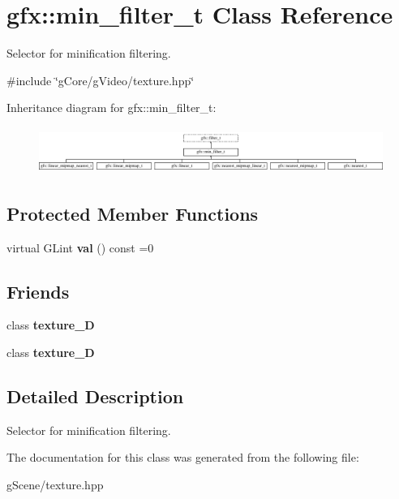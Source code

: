 \hypertarget{classgfx_1_1min__filter__t}{\section{gfx\-:\-:min\-\_\-filter\-\_\-t Class Reference}
\label{classgfx_1_1min__filter__t}
}


Selector for minification filtering.  




{\ttfamily \#include \char`\"{}g\-Core/g\-Video/texture.\-hpp\char`\"{}}

Inheritance diagram for gfx\-:\-:min\-\_\-filter\-\_\-t\-:\begin{figure}[H]
\begin{center}
\leavevmode
\includegraphics[height=1.530055cm]{classgfx_1_1min__filter__t}
\end{center}
\end{figure}
\subsection*{Protected Member Functions}
\begin{DoxyCompactItemize}
\item 
\hypertarget{classgfx_1_1min__filter__t_a75592c379c8d1a09f9d974967afc6584}{virtual G\-Lint {\bfseries val} () const =0}\label{classgfx_1_1min__filter__t_a75592c379c8d1a09f9d974967afc6584}

\end{DoxyCompactItemize}
\subsection*{Friends}
\begin{DoxyCompactItemize}
\item 
\hypertarget{classgfx_1_1min__filter__t_a2039d67f6166ccf823c78e3476aad9aa}{class {\bfseries texture\-\_\-D}}\label{classgfx_1_1min__filter__t_a2039d67f6166ccf823c78e3476aad9aa}

\item 
\hypertarget{classgfx_1_1min__filter__t_a22ad86ef46c3b17357a0cd59e50bc7dd}{class {\bfseries texture\-\_\-D}}\label{classgfx_1_1min__filter__t_a22ad86ef46c3b17357a0cd59e50bc7dd}

\end{DoxyCompactItemize}


\subsection{Detailed Description}
Selector for minification filtering. 

The documentation for this class was generated from the following file\-:\begin{DoxyCompactItemize}
\item 
g\-Scene/texture.\-hpp\end{DoxyCompactItemize}
